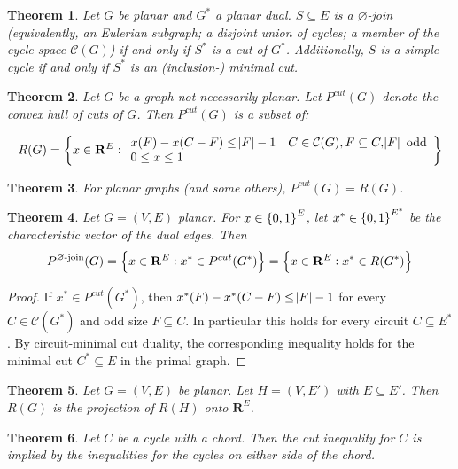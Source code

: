 \documentclass{article}
\newtheorem{theorem}{Theorem}
\begin{document}
\begin{theorem}
Let $G$ be planar and $G^*$ a planar dual. $S\subseteq E$ is a $\varnothing$-join (equivalently, an Eulerian subgraph; a disjoint union of cycles; a member of the cycle space $\mathcal{C}(G)$) if and only if $S^*$ is a cut of $G^*$. Additionally,
$S$ is a simple cycle if and only if $S^*$ is an (inclusion-) minimal cut.
\end{theorem}

\begin{theorem}
Let $G$ be a graph not necessarily planar.
Let $P^{cut}(G)$ denote the convex hull of cuts of $G$. Then $P^{cut}(G)$ is a subset of:

$$ R(G) = \cbr{x\in \mathbf{R}^E: \begin{array}{ll}
x(F)-x(C-F)\leq \abs{F}-1 & C\in \mathcal{C}(G), F\subseteq C, \abs{F}\text{ odd} \\
0\leq x\leq 1
\end{array}}$$

\end{theorem}

\begin{theorem}
For planar graphs (and some others), $P^{cut}(G) = R(G)$.
\end{theorem}

\begin{theorem}
Let $G=(V,E)$ planar.
For $x\in \cbr{0,1}^E$, let $x^*\in\cbr{0,1}^{E^*}$ be the characteristic
vector of the dual edges. Then
$$P^{\text{$\varnothing$-join}}(G) = \cbr{x\in\mathbf{R}^E: x^*\in P^{cut}(G^*)} = \cbr{x\in\mathbf{R}^E: x^*\in R(G^*)}$$
\end{theorem}

\begin{proof}
If $x^* \in P^{cut}(G^*)$, then $x^*(F)-x^*(C-F)\leq \abs{F}-1$ for every $C\in \mathcal{C}(G^*)$ and odd size $F\subseteq C$. In particular this holds for every circuit $C\subseteq E^*$. By circuit-minimal cut duality, the corresponding inequality holds for the minimal cut $C^*\subseteq E$ in the primal graph.
\end{proof}


\begin{theorem}
Let $G=(V,E)$ be planar. Let $H=(V, E')$ with $E\subseteq E'$. Then $R(G)$ is the projection of $R(H)$ onto $\mathbf{R}^E$.
\end{theorem}

\begin{theorem}
Let $C$ be a cycle with a chord. Then the cut inequality for $C$ is implied by the inequalities for the cycles on either side of the chord. 
\end{theorem}
\end{document}
